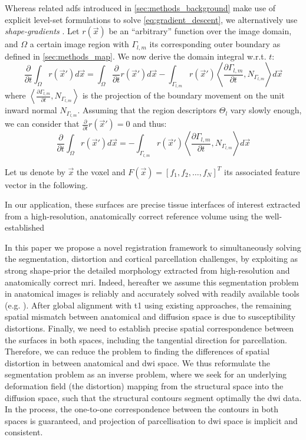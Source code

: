 Whereas related \glspl*{adf} introduced in \autoref{sec:methods_background}
make use of explicit level-set formulations to solve \eqref{eq:gradient_descent},
we alternatively use \emph{shape-gradients}
\cite{besson_dream2s_2003,herbulot_segmentation_2006}.
Let $r(\vec{x})$ be an ``arbitrary'' function over the image domain,
and $\Omega$ a certain image region with $\Gamma_{l,m}$ its corresponding
outer boundary as defined in \autoref{sec:methods_map}.
We now derive the domain integral w.r.t. $t$:
\begin{equation*}
\frac{\partial}{\partial t} \int_\Omega r(\vec{x}') d\vec{x} = \int_\Omega \frac{\partial}{\partial t}r(\vec{x}') d\vec{x} - \int_{\Gamma_{l,m}} r(\vec{x}') \left\langle \frac{\partial \Gamma_{l,m} }{\partial t}, N_{\Gamma_{l,m}}\right\rangle d\vec{x}
\end{equation*}
where $\left\langle\frac{\partial\Gamma_{l,m}}{\partial t}, N_{\Gamma_{l,m}}\right\rangle$ is
the projection of the boundary movement on the unit inward normal $N_{\Gamma_{l,m}}$. Assuming
that the region descriptors $\Theta_l$ vary slowly enough, we can consider
that $\frac{\partial}{\partial t} r(\vec{x}') = 0$ and thus:
\begin{equation}
\frac{\partial}{\partial t} \int_\Omega r(\vec{x}') d\vec{x} =
- \int_{\Gamma_{l,m}} r(\vec{x}') \left\langle \frac{\partial \Gamma_{l,m} }{\partial t}, N_{\Gamma_{l,m}}\right\rangle d\vec{x}
\label{eq:shape_gradients}
\end{equation}

Let us denote by $\vec{x}$ the voxel and $F(\vec{x}) = [ f_1, f_2, \ldots, f_N]^T$
  its associated feature vector in the following.

In our application, these surfaces are precise tissue interfaces of interest extracted
  from a high-resolution, anatomically correct reference volume using
  the well-established

In this paper we propose a novel registration framework to simultaneously
solving the segmentation, distortion and cortical parcellation challenges,
by exploiting as strong shape-prior the detailed morphology extracted
from high-resolution and anatomically correct \gls{mri}.
Indeed, hereafter
we assume this segmentation problem in anatomical images is reliably and
accurately solved with readily available tools (e.g.
\citep{fischl_freesurfer_2012}).
After global alignment with \gls{t1} using existing approaches, the remaining
spatial mismatch between anatomical and diffusion space is due to susceptibility
distortions.
Finally, we need to establish precise spatial correspondence between the
surfaces in both spaces, including the tangential direction for parcellation.
Therefore, we can reduce the problem to finding the differences of spatial
distortion in between anatomical and \gls{dwi} space.
We thus reformulate the segmentation problem as an inverse problem, where we
seek for an underlying deformation field (the distortion) mapping
from the structural space into the diffusion space, such that the structural
contours segment optimally the \gls{dwi} data.
In the process, the one-to-one
correspondence between the contours in both spaces is guaranteed, and projection
of parcellisation to \gls{dwi} space is implicit and consistent.

